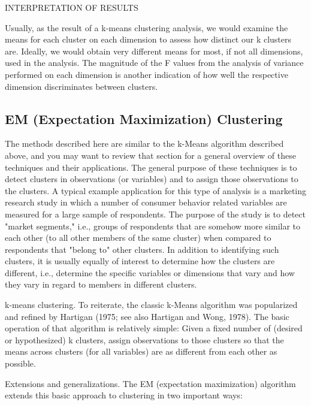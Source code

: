 INTERPRETATION OF RESULTS

Usually, as the result of a k-means clustering analysis, we would examine the means for each cluster on each dimension to assess how distinct our k clusters are. Ideally, we would obtain very different means for most, if not all dimensions, used in the analysis. The magnitude of the F values from the analysis of variance performed on each dimension is another indication of how well the respective dimension discriminates between clusters.

\newpage
\subsection{EM (Expectation Maximization) Clustering}
%

The methods described here are similar to the k-Means algorithm described above, and you may want to review that section for a general overview of these techniques and their applications. The general purpose of these techniques is to detect clusters in observations (or variables) and to assign those observations to the clusters. A typical example application for this type of analysis is a marketing research study in which a number of consumer behavior related variables are measured for a large sample of respondents. The purpose of the study is to detect "market segments," i.e., groups of respondents that are somehow more similar to each other (to all other members of the same cluster) when compared to respondents that "belong to" other clusters. In addition to identifying such clusters, it is usually equally of interest to determine how the clusters are different, i.e., determine the specific variables or dimensions that vary and how they vary in regard to members in different clusters.

k-means clustering. To reiterate, the classic k-Means algorithm was popularized and refined by Hartigan (1975; see also Hartigan and Wong, 1978). The basic operation of that algorithm is relatively simple: Given a fixed number of (desired or hypothesized) k clusters, assign observations to those clusters so that the means across clusters (for all variables) are as different from each other as possible.

Extensions and generalizations. The EM (expectation maximization) algorithm extends this basic approach to clustering in two important ways:

